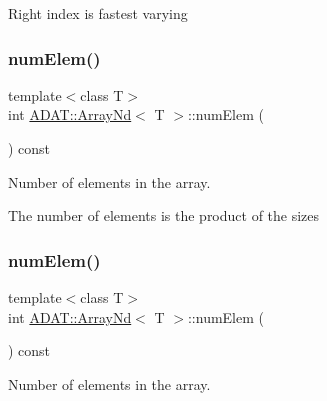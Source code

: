Right index is fastest varying \mbox{\label{classADAT_1_1ArrayNd_a5c33ae0e66b53a2fd86f804f0f4292e9}} 
\subsubsection{\texorpdfstring{numElem()}{numElem()}\hspace{0.1cm}{\footnotesize\ttfamily [1/3]}}
{\footnotesize\ttfamily template$<$class T$>$ \\
int \mbox{\hyperlink{classADAT_1_1ArrayNd}{A\+D\+A\+T\+::\+Array\+Nd}}$<$ T $>$\+::num\+Elem (\begin{DoxyParamCaption}{ }\end{DoxyParamCaption}) const\hspace{0.3cm}{\ttfamily [inline]}}



Number of elements in the array. 

The number of elements is the product of the sizes \mbox{\label{classADAT_1_1ArrayNd_a5c33ae0e66b53a2fd86f804f0f4292e9}} 
\subsubsection{\texorpdfstring{numElem()}{numElem()}\hspace{0.1cm}{\footnotesize\ttfamily [2/3]}}
{\footnotesize\ttfamily template$<$class T$>$ \\
int \mbox{\hyperlink{classADAT_1_1ArrayNd}{A\+D\+A\+T\+::\+Array\+Nd}}$<$ T $>$\+::num\+Elem (\begin{DoxyParamCaption}{ }\end{DoxyParamCaption}) const\hspace{0.3cm}{\ttfamily [inline]}}



Number of elements in the array. 

